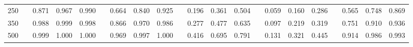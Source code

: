 % 
\begin{tabular}{ccccccccccccccccccccc}
  \hline
  \hline
250 &  & 0.871 & 0.967 & 0.990 &  & 0.664 & 0.840 & 0.925 &  & 0.196 & 0.361 & 0.504 &  & 0.059 & 0.160 & 0.286 &  & 0.565 & 0.748 & 0.869 \\ 
  350 &  & 0.988 & 0.999 & 0.998 &  & 0.866 & 0.970 & 0.986 &  & 0.277 & 0.477 & 0.635 &  & 0.097 & 0.219 & 0.319 &  & 0.751 & 0.910 & 0.936 \\ 
  500 &  & 0.999 & 1.000 & 1.000 &  & 0.969 & 0.997 & 1.000 &  & 0.416 & 0.695 & 0.791 &  & 0.131 & 0.321 & 0.445 &  & 0.914 & 0.986 & 0.993 \\ 
   \hline
\end{tabular}
